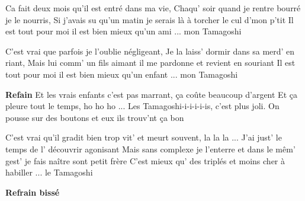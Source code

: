 \footnotemark [
ititle={Tamagoshi, le},
tu={Mon fils, ma bataille (Daniel Balavoine)}]


\beginverse
Ca fait deux mois qu'il est entré dans ma vie,
Chaqu' soir quand je rentre bourré je le nourris,
Si j'avais su qu'un matin je serais là à torcher le cul d'mon p'tit
Il est tout pour moi il est bien mieux qu'un ami ... mon Tamagoshi
\endverse

\beginverse
C'est vrai que parfois je l'oublie négligeant,
Je la laiss' dormir dans sa merd' en riant,
Mais lui comm' un fils aimant il me pardonne et revient en souriant
Il est tout pour moi il est bien mieux qu'un enfant ... mon Tamagoshi
\endverse

\beginchorus
\textbf{Refain}
Et les vrais enfants c'est pas marrant, ça coûte beaucoup d'argent
Et ça pleure tout le temps, ho ho ho ...
Les Tamagoshi-i-i-i-i-is, c'est plus joli.
On pousse sur des boutons et eux ils trouv'nt ça bon
\endchorus

\beginverse
C'est vrai qu'il gradit bien trop vit' et meurt souvent, la la la ...
J'ai just' le temps de l' découvrir agonisant
Mais sans complexe je l'enterre et dans le mêm' gest' je fais naître sont petit frère
C'est mieux qu' des triplés et moins cher à habiller ... le Tamagoshi
\endverse

\beginchorus
\textbf{Refrain bissé}
\endchorus
\endsong